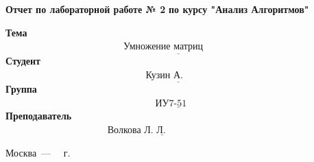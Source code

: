 \begin{titlepage}
	
	\begin{center}\centering
		\Large\textbf{Отчет по лабораторной работе № 2}
		\Large\textbf {по курсу "Анализ Алгоритмов"}
	\end{center}
	
	\noindent\textbf{Тема} $\underline{\text{~~~~~~~~~~~~~~~~~~~~~~~~~~~~~~~~~~~~
	Умножение матриц (сложность)~~~~~~~~~~~~~~~~~~~~~~~~~~~~~~~~~~~~~}}$\newline\newline\newline\newline\newline
	\noindent\textbf{Студент} $\underline{\text{~~~~~~~~~~~~~~~~~~~~~~~~~~~~~~~~~~~~~~~~~~~~Кузин А. А.~~~~~~~~~~~~~~~~~~~~~~~~~~~~~~~~~~~~~~~~~~~~~~~~~}}$\newline\newline
	\noindent\textbf{Группа} $\underline{\text{~~~~~~~~~~~~~~~~~~~~~~~~~~~~~~~~~~~~~~~~~~~~~~~ИУ7-51 Б~~~~~~~~~~~~~~~~~~~~~~~~~~~~~~~~~~~~~~~~~~~~~~~~~~}}$\newline\newline
	\noindent\textbf{Преподаватель} $\underline{\text{~~~~~~~~~~~~~~~~~~~~~~~~~~~~~~~~Волкова Л. Л.~~~~~~~~~~~~~~~~~~~~~~~~~~~~~~~~~~~~~~~~~~~~~~~~}}$\newline
	

	\begin{center}
		\vfill
		Москва~---~\the\year
		~г.
	\end{center}
	\restoregeometry
\end{titlepage}